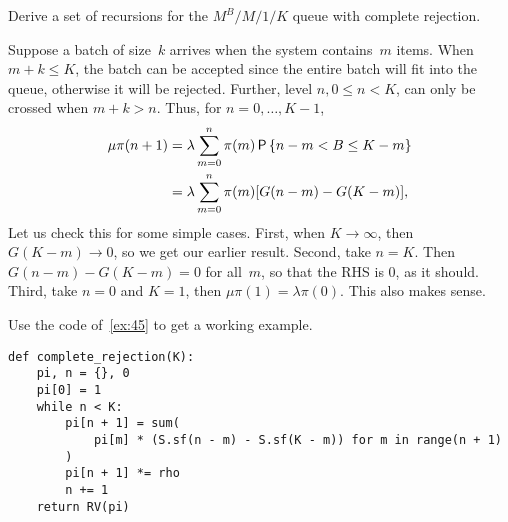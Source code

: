 \documentclass[stochastic-or.tex]{subfiles}
\begin{document}
\begin{exercise}\label{ex:l-156}
 Derive a set of recursions for the $M^B/M/1/K$ queue with complete rejection.
\begin{solution}
  Suppose a batch of size~$k$ arrives when the system contains~$m$ items.
  When $m+k \leq K$, the batch can be accepted since the entire batch will fit into the queue, otherwise it will be rejected.
  Further, level $n, 0\leq n < K$, can only be crossed when $m+k > n$.
  Thus, for $n=0,\ldots, K-1$,
 \begin{align*}
 \mu \pi(n+1) &= \lambda \sum_{m=0}^n \pi(m) \P{n-m < B \leq K-m} \\
&=\lambda \sum_{m=0}^n \pi(m) [G(n-m)-G(K-m)],
 \end{align*}
 Let us check this for some simple cases.
 First, when $K\to \infty$, then $G(K-m)\to 0$, so we get our earlier result.
 Second, take $n=K$.
 Then $G(n-m)-G(K-m)=0$ for all~$m$, so that the RHS is 0, as it should.
 Third, take $n=0$ and $K=1$, then $\mu \pi(1)= \lambda \pi(0)$.
 This also makes sense.

Use the code of~\cref{ex:45} to get a working example.
\begin{verbatim}
def complete_rejection(K):
    pi, n = {}, 0
    pi[0] = 1
    while n < K:
        pi[n + 1] = sum(
            pi[m] * (S.sf(n - m) - S.sf(K - m)) for m in range(n + 1)
        )
        pi[n + 1] *= rho
        n += 1
    return RV(pi)
\end{verbatim}
\end{solution}
\end{exercise}
\end{document}
